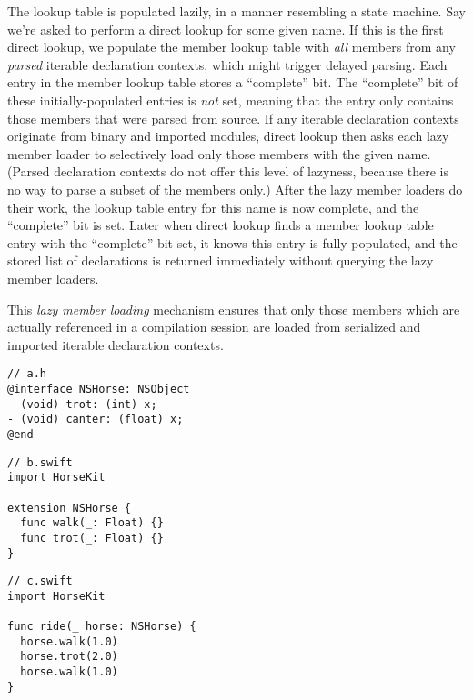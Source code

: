\documentclass[../generics]{subfiles}
\begin{document}
The lookup table is populated lazily, in a manner resembling a state machine. Say we're asked to perform a direct lookup for some given name. If this is the first direct lookup, we populate the member lookup table with \emph{all} members from any \emph{parsed} iterable declaration contexts, which might trigger delayed parsing. Each entry in the member lookup table stores a ``complete'' bit. The ``complete'' bit of these initially-populated entries is \emph{not} set, meaning that the entry only contains those members that were parsed from source. If any iterable declaration contexts originate from binary and imported modules, direct lookup then asks each lazy member loader to selectively load only those members with the given name. (Parsed declaration contexts do not offer this level of lazyness, because there is no way to parse a subset of the members only.) After the lazy member loaders do their work, the lookup table entry for this name is now complete, and the ``complete'' bit is set. Later when direct lookup finds a member lookup table entry with the ``complete'' bit set, it knows this entry is fully populated, and the stored list of declarations is returned immediately without querying the lazy member loaders.

This \emph{lazy member loading} mechanism ensures that only those members which are actually referenced in a compilation session are loaded from serialized and imported iterable declaration contexts.

\begin{listing}\label{lazy member listing}
\begin{Verbatim}
// a.h
@interface NSHorse: NSObject
- (void) trot: (int) x;
- (void) canter: (float) x;
@end
\end{Verbatim}
\begin{Verbatim}
// b.swift
import HorseKit

extension NSHorse {
  func walk(_: Float) {}
  func trot(_: Float) {}
}
\end{Verbatim}
\begin{Verbatim}
// c.swift
import HorseKit

func ride(_ horse: NSHorse) {
  horse.walk(1.0)
  horse.trot(2.0)
  horse.walk(1.0)
}
\end{Verbatim}
\end{listing}
\end{document}
